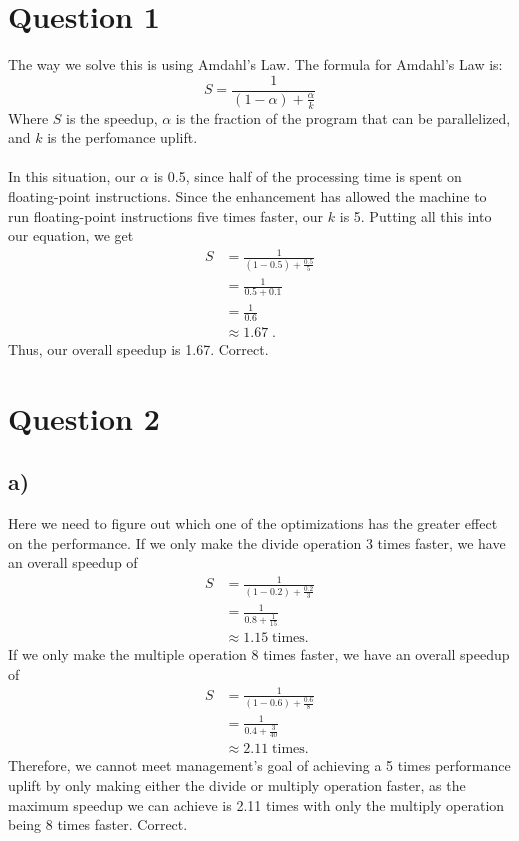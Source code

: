 \documentclass{article}
\begin{document}
\section*{Question 1}
The way we solve this is using Amdahl's Law.
The formula for Amdahl's Law is: 
$$ S = \frac{1}{(1 - \alpha) + \frac{\alpha}{k}} $$
Where $S$ is the speedup, $\alpha$ is the fraction of the program that can be parallelized, and $k$ is the perfomance uplift.
\\ \\
In this situation, our $\alpha$ is 0.5, since half of the processing time is spent on floating-point instructions.
Since the enhancement has allowed the machine to run floating-point instructions five times faster, our $k$ is 5.
Putting all this into our equation, we get
\begin{align*}
S &= \frac{1}{(1 - 0.5) + \frac{0.5}{5}} \\
&= \frac{1}{0.5 + 0.1} \\
&= \frac{1}{0.6} \\
&\approx 1.67 \; .
\end{align*}
Thus, our overall speedup is 1.67.
\textcolor{mygreen}{Correct.}

\section*{Question 2}

\subsection*{a)}
Here we need to figure out which one of the optimizations has the greater effect on the performance.
If we only make the divide operation 3 times faster, we have an overall speedup of
\begin{align*}
    S &= \frac{1}{(1 - 0.2) + \frac{0.2}{3}} \\
    &= \frac{1}{0.8 + \frac{1}{15}} \\
    &\approx 1.15 \; \text{times.}
\end{align*}
If we only make the multiple operation 8 times faster, we have an overall speedup of
\begin{align*}
    S &= \frac{1}{(1 - 0.6) + \frac{0.6}{8}} \\
    &= \frac{1}{0.4 + \frac{3}{40}} \\
    &\approx 2.11 \; \text{times.}
\end{align*}
Therefore, we cannot meet management's goal of achieving a 5 times performance uplift by only making either the divide or multiply operation faster, 
as the maximum speedup we can achieve is 2.11 times with only the multiply operation being 8 times faster.
\textcolor{mygreen}{Correct.}
\end{document}
